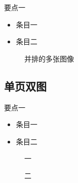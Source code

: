 \documentclass[
    fontset=fandol,
    xcolor=svgnames %
]{ctexbeamer}
\begin{document}
\begin{frame}

    \begin{block}{要点一}
        \begin{itemize}
            \item 条目一
            \item 条目二
        \end{itemize}
    \end{block}

    \begin{figure} %
        \caption{并排的多张图像}
        \label{fig:multi-image-example1}
    \end{figure}

\end{frame}

\subsection{单页双图}

\begin{frame}

    \begin{block}{要点一}
        \begin{itemize}
            \item 条目一
            \item 条目二
        \end{itemize}
    \end{block}

    \begin{figure}
        \begin{minipage}{0.49\textwidth}
            \caption{一}
        \end{minipage}
        \begin{minipage}{0.49\textwidth}
            \caption{二}
        \end{minipage}
    \end{figure}

\end{frame}
\end{document}
